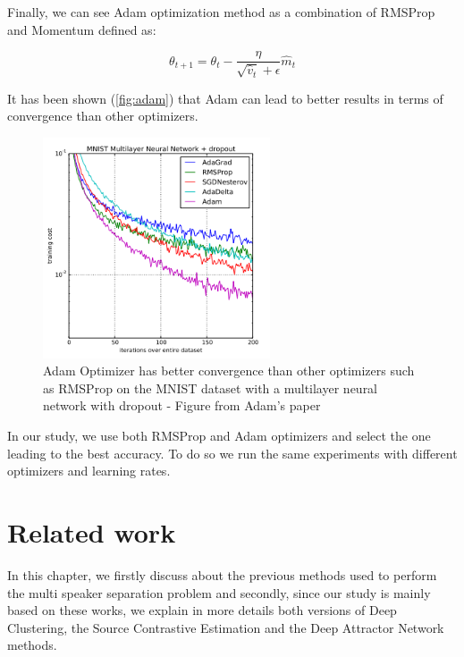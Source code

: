 \documentclass[master, tikz, final,11pt, dvipdfmx]{iscs-thesis}
\begin{document}
Finally, we can see Adam optimization method as a combination of RMSProp and Momentum defined as:

\[\theta_{t+1} = \theta_t - \frac{\eta}{\sqrt{ \hat v_t}+\epsilon} \hat m_t\]

It has been shown (\autoref{fig:adam}) that Adam can lead to better results in terms of convergence than other optimizers.

\begin{figure}[h]
\centering
\includegraphics[width=0.6\textwidth]{adam}
\caption[Comparison of SGD, Adam and RMSProp performances]{ Adam Optimizer has better convergence than other optimizers such as RMSProp on the MNIST dataset with a multilayer neural network with dropout - Figure from Adam's paper \cite{ADAM}}
\label{fig:adam} 
\end{figure}

In our study, we use both RMSProp and Adam optimizers and select the one leading to the best accuracy. To do so we run the same experiments with different optimizers and learning rates.

\chapter{Related work}

In this chapter, we firstly discuss about the previous methods used to perform the multi speaker separation problem and secondly, since our study is mainly based on these works, we explain in more details both versions of Deep Clustering, the Source Contrastive Estimation and the Deep Attractor Network methods.
\end{document}
